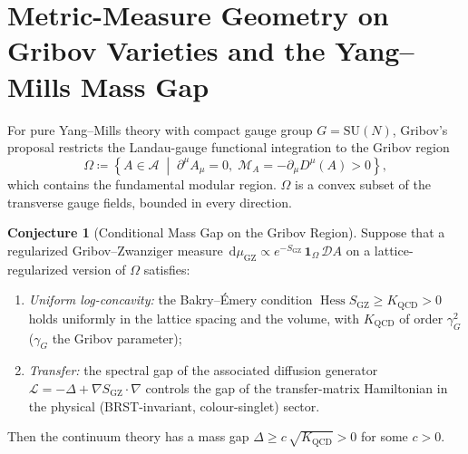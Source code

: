 \documentclass[11pt,a4paper,reqno]{amsart}
\theoremstyle{definition}
\newtheorem{conjecture}[theorem]{Conjecture}
\numberwithin{equation}{section}
\newcommand{\Hess}{\operatorname{Hess}}
\newcommand{\dif}{\,\mathrm{d}}
\newcommand{\SU}{\mathrm{SU}}
\begin{document}
\section{Metric-Measure Geometry on Gribov Varieties and the Yang--Mills Mass Gap}
\label{sec:yang_mills_gap}

For pure Yang--Mills theory with compact gauge group $G = \SU(N)$, Gribov's proposal restricts the Landau-gauge functional integration to the Gribov region \cite{gribov1978quantization, zwanziger1989local, vandersickel2012gribov}
\begin{equation}
    \Omega \coloneqq \left\{ A \in \mathcal{A} \;\middle|\; \partial^\mu A_\mu = 0, \; \mathcal{M}_A = -\partial_\mu D^\mu(A) > 0 \right\},
\end{equation}
which contains the fundamental modular region. $\Omega$ is a convex subset of the transverse gauge fields, bounded in every direction.

\begin{conjecture}[Conditional Mass Gap on the Gribov Region]
\label{thm:yang_mills_gap}
Suppose that a regularized Gribov--Zwanziger measure $\dif\mu_{\mathrm{GZ}} \propto e^{-S_{\mathrm{GZ}}}\,\mathbf{1}_\Omega\,\mathcal{D}A$ on a lattice-regularized version of $\Omega$ satisfies:
\begin{enumerate}[label=(H\arabic*)]
    \item \emph{Uniform log-concavity:} the Bakry--\'Emery condition $\Hess S_{\mathrm{GZ}} \ge K_{\mathrm{QCD}} > 0$ holds uniformly in the lattice spacing and the volume, with $K_{\mathrm{QCD}}$ of order $\gamma_G^2$ ($\gamma_G$ the Gribov parameter);
    \item \emph{Transfer:} the spectral gap of the associated diffusion generator $\mathcal{L} = -\Delta + \nabla S_{\mathrm{GZ}} \cdot \nabla$ controls the gap of the transfer-matrix Hamiltonian in the physical (BRST-invariant, colour-singlet) sector.
\end{enumerate}
Then the continuum theory has a mass gap $\Delta \ge c\,\sqrt{K_{\mathrm{QCD}}} > 0$ for some $c > 0$.
\end{conjecture}
\end{document}

